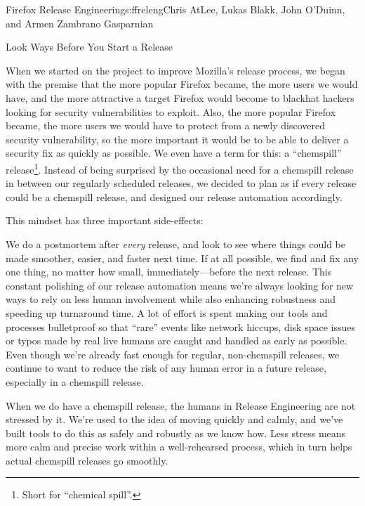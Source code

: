 \begin{aosachapter}{Firefox Release Engineering}{s:ffreleng}{Chris AtLee, Lukas Blakk, John O'Duinn, and Armen Zambrano Gasparnian}
\begin{aosasect1}{Look  Ways Before You Start a Release}

When we started on the project to improve Mozilla's release process,
we began with the premise that the more popular Firefox became, the
more users we would have, and the more attractive a target Firefox would
become to blackhat hackers looking for security vulnerabilities to
exploit. Also, the more popular Firefox became, the more users we
would have to protect from a newly discovered security vulnerability,
so the more important it would be to be able to deliver a security fix as quickly
as possible. We even have a term for this: a ``chemspill''
release\footnote{Short for ``chemical spill''.}. Instead of being surprised by the occasional need for a
chemspill release in between our regularly scheduled releases, we
decided to plan as if every release could be a chemspill release, and
designed our release automation accordingly.

This mindset has three important side-effects:

\begin{aosaenumerate}

\item We do a postmortem after \emph{every} release, and look to see
  where things could be made smoother, easier, and faster next
  time. If at all possible, we find and fix any one thing,
  no matter how small, immediately---before the next release. This constant
  polishing of our release automation means we're always looking for
  new ways to rely on less human involvement while also enhancing
  robustness and speeding up turnaround time. A lot of effort is spent
  making our tools and processes bulletproof so that ``rare'' events
  like network hiccups, disk space issues or typos made by real live
  humans are caught and handled as early as possible.  Even though
  we're already fast enough for regular, non-chemspill releases, we
  continue to want to reduce the risk of any human error in a future
  release, especially in a chemspill release.

\item When we do have a chemspill release, the humans in Release
  Engineering are not stressed by it. We're used to the idea of moving
  quickly and calmly, and we've built tools to do
  this as safely and robustly as we know how. Less stress means more
  calm and precise work within a well-rehearsed process, which in turn
  helps actual chemspill releases go smoothly.


\end{aosaenumerate}
\end{aosasect1}
\end{aosachapter}
